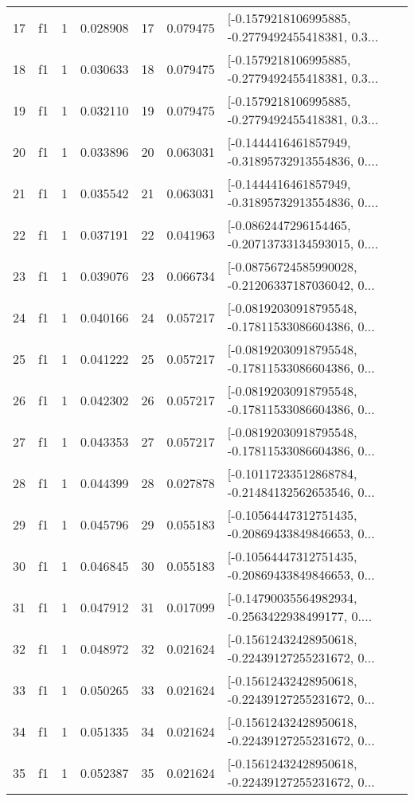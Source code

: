 \begin{tabular}{lllrlrl}
17  &  f1 &   1 &  0.028908 &   17 &  0.079475 &  [-0.1579218106995885, -0.2779492455418381, 0.3... \\
18  &  f1 &   1 &  0.030633 &   18 &  0.079475 &  [-0.1579218106995885, -0.2779492455418381, 0.3... \\
19  &  f1 &   1 &  0.032110 &   19 &  0.079475 &  [-0.1579218106995885, -0.2779492455418381, 0.3... \\
20  &  f1 &   1 &  0.033896 &   20 &  0.063031 &  [-0.1444416461857949, -0.31895732913554836, 0.... \\
21  &  f1 &   1 &  0.035542 &   21 &  0.063031 &  [-0.1444416461857949, -0.31895732913554836, 0.... \\
22  &  f1 &   1 &  0.037191 &   22 &  0.041963 &  [-0.0862447296154465, -0.20713733134593015, 0.... \\
23  &  f1 &   1 &  0.039076 &   23 &  0.066734 &  [-0.08756724585990028, -0.21206337187036042, 0... \\
24  &  f1 &   1 &  0.040166 &   24 &  0.057217 &  [-0.08192030918795548, -0.17811533086604386, 0... \\
25  &  f1 &   1 &  0.041222 &   25 &  0.057217 &  [-0.08192030918795548, -0.17811533086604386, 0... \\
26  &  f1 &   1 &  0.042302 &   26 &  0.057217 &  [-0.08192030918795548, -0.17811533086604386, 0... \\
27  &  f1 &   1 &  0.043353 &   27 &  0.057217 &  [-0.08192030918795548, -0.17811533086604386, 0... \\
28  &  f1 &   1 &  0.044399 &   28 &  0.027878 &  [-0.10117233512868784, -0.21484132562653546, 0... \\
29  &  f1 &   1 &  0.045796 &   29 &  0.055183 &  [-0.10564447312751435, -0.20869433849846653, 0... \\
30  &  f1 &   1 &  0.046845 &   30 &  0.055183 &  [-0.10564447312751435, -0.20869433849846653, 0... \\
31  &  f1 &   1 &  0.047912 &   31 &  0.017099 &  [-0.14790035564982934, -0.2563422938499177, 0.... \\
32  &  f1 &   1 &  0.048972 &   32 &  0.021624 &  [-0.15612432428950618, -0.22439127255231672, 0... \\
33  &  f1 &   1 &  0.050265 &   33 &  0.021624 &  [-0.15612432428950618, -0.22439127255231672, 0... \\
34  &  f1 &   1 &  0.051335 &   34 &  0.021624 &  [-0.15612432428950618, -0.22439127255231672, 0... \\
35  &  f1 &   1 &  0.052387 &   35 &  0.021624 &  [-0.15612432428950618, -0.22439127255231672, 0... \\

\end{tabular}
